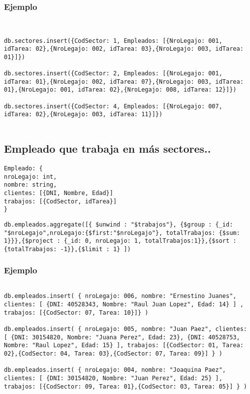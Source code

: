 \subsubsection{Ejemplo}
\begin{lstlisting}


db.sectores.insert({CodSector: 1, Empleados: [{NroLegajo: 001, idTarea: 02},{NroLegajo: 002, idTarea: 03},{NroLegajo: 003, idTarea: 01}]})

db.sectores.insert({CodSector: 2, Empleados: [{NroLegajo: 001, idTarea: 01},{NroLegajo: 002, idTarea: 07},{NroLegajo: 003, idTarea: 01},{NroLegajo: 001, idTarea: 02},{NroLegajo: 008, idTarea: 12}]})

db.sectores.insert({CodSector: 4, Empleados: [{NroLegajo: 007, idTarea: 02},{NroLegajo: 003, idTarea: 11}]})


\end{lstlisting}

\subsection{Empleado que trabaja en más sectores..}

\begin{lstlisting}
Empleado: {
nroLegajo: int,
nombre: string,
clientes: [{DNI, Nombre, Edad}]
trabajos: [{CodSector, idTarea}]
}

\end{lstlisting}


\begin{lstlisting}
db.empleados.aggregate([{ $unwind : "$trabajos"}, {$group : {_id: "$nroLegajo",nroLegajo:{$first:"$nroLegajo"}, totalTrabajos: {$sum: 1}}},{$project : {_id: 0, nroLegajo: 1, totalTrabajos:1}},{$sort : {totalTrabajos: -1}},{$limit : 1} ])
\end{lstlisting}

\subsubsection{Ejemplo}

\begin{lstlisting}

db.empleados.insert( { nroLegajo: 006, nombre: "Ernestino Juanes", clientes: [ {DNI: 40528343, Nombre: "Raul Juan Lopez", Edad: 14} ] , trabajos: [{CodSector: 07, Tarea: 10}]} )

db.empleados.insert( { nroLegajo: 005, nombre: "Juan Paez", clientes: [ {DNI: 30154820, Nombre: "Juana Perez", Edad: 23}, {DNI: 40528753, Nombre: "Raul Lopez", Edad: 15} ], trabajos: [{CodSector: 01, Tarea: 02},{CodSector: 04, Tarea: 03},{CodSector: 07, Tarea: 09}] } )

db.empleados.insert( { nroLegajo: 004, nombre: "Joaquina Paez", clientes: [ {DNI: 30154820, Nombre: "Juan Perez", Edad: 25} ], trabajos: [{CodSector: 09, Tarea: 01},{CodSector: 03, Tarea: 05}] } )

\end{lstlisting}



